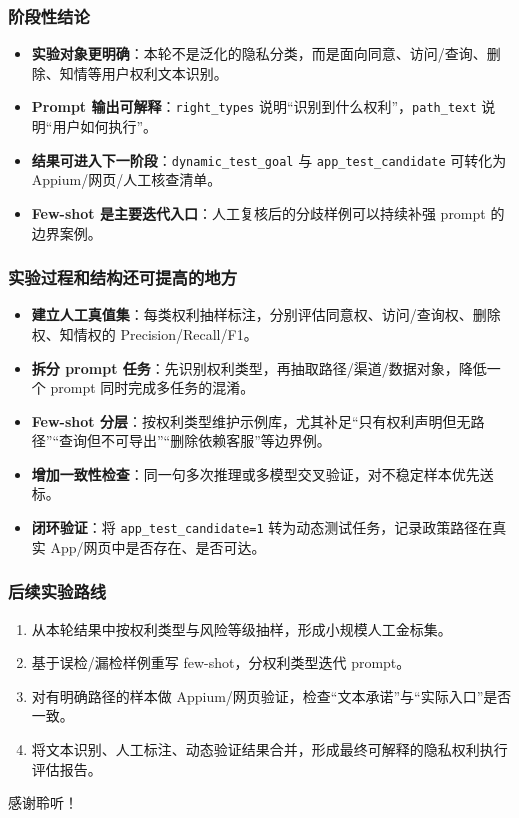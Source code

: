 \documentclass[AutoFakeBold,AutoFakeSlant]{beamer}
\begin{document}
\begin{frame}
    \frametitle{阶段性结论}
    \small
    \begin{itemize}
        \item \textbf{实验对象更明确}：本轮不是泛化的隐私分类，而是面向同意、访问/查询、删除、知情等用户权利文本识别。
        \item \textbf{Prompt 输出可解释}：\texttt{right\_types} 说明“识别到什么权利”，\texttt{path\_text} 说明“用户如何执行”。
        \item \textbf{结果可进入下一阶段}：\texttt{dynamic\_test\_goal} 与 \texttt{app\_test\_candidate} 可转化为 Appium/网页/人工核查清单。
        \item \textbf{Few-shot 是主要迭代入口}：人工复核后的分歧样例可以持续补强 prompt 的边界案例。
    \end{itemize}
\end{frame}

\begin{frame}
    \frametitle{实验过程和结构还可提高的地方}
    \small
    \begin{itemize}
        \item \textbf{建立人工真值集}：每类权利抽样标注，分别评估同意权、访问/查询权、删除权、知情权的 Precision/Recall/F1。
        \item \textbf{拆分 prompt 任务}：先识别权利类型，再抽取路径/渠道/数据对象，降低一个 prompt 同时完成多任务的混淆。
        \item \textbf{Few-shot 分层}：按权利类型维护示例库，尤其补足“只有权利声明但无路径”“查询但不可导出”“删除依赖客服”等边界例。
        \item \textbf{增加一致性检查}：同一句多次推理或多模型交叉验证，对不稳定样本优先送标。
        \item \textbf{闭环验证}：将 \texttt{app\_test\_candidate=1} 转为动态测试任务，记录政策路径在真实 App/网页中是否存在、是否可达。
    \end{itemize}
\end{frame}

\begin{frame}
    \frametitle{后续实验路线}
    \small
    \begin{enumerate}
        \item 从本轮结果中按权利类型与风险等级抽样，形成小规模人工金标集。
        \item 基于误检/漏检样例重写 few-shot，分权利类型迭代 prompt。
        \item 对有明确路径的样本做 Appium/网页验证，检查“文本承诺”与“实际入口”是否一致。
        \item 将文本识别、人工标注、动态验证结果合并，形成最终可解释的隐私权利执行评估报告。
    \end{enumerate}
\end{frame}

\begin{frame}
    \begin{center}
        {\Huge 感谢聆听！}
    \end{center}
\end{frame}
\end{document}
